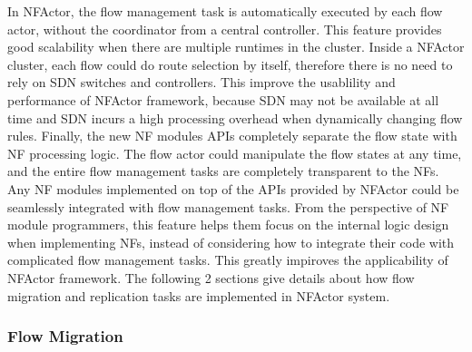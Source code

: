 In NFActor, the flow management task is automatically executed by each flow actor, without the coordinator from a central controller. This feature provides good scalability when there are multiple runtimes in the cluster. Inside a NFActor cluster, each flow could do route selection by itself, therefore there is no need to rely on SDN switches and controllers. This improve the usablility and performance of NFActor framework, because SDN may not be available at all time and SDN incurs a high processing overhead when dynamically changing flow rules. Finally, the new NF modules APIs completely separate the flow state with NF processing logic. The flow actor could manipulate the flow states at any time, and the entire flow management tasks are completely transparent to the NFs. Any NF modules implemented on top of the APIs provided by NFActor could be seamlessly integrated with flow management tasks. From the perspective of NF module programmers, this feature helps them focus on the internal logic design when implementing NFs, instead of considering how to integrate their code with complicated flow management tasks. This greatly impiroves the applicability of NFActor framework. The following 2 sections give details about how flow migration and replication tasks are implemented in NFActor system.

\subsubsection{Flow Migration}

